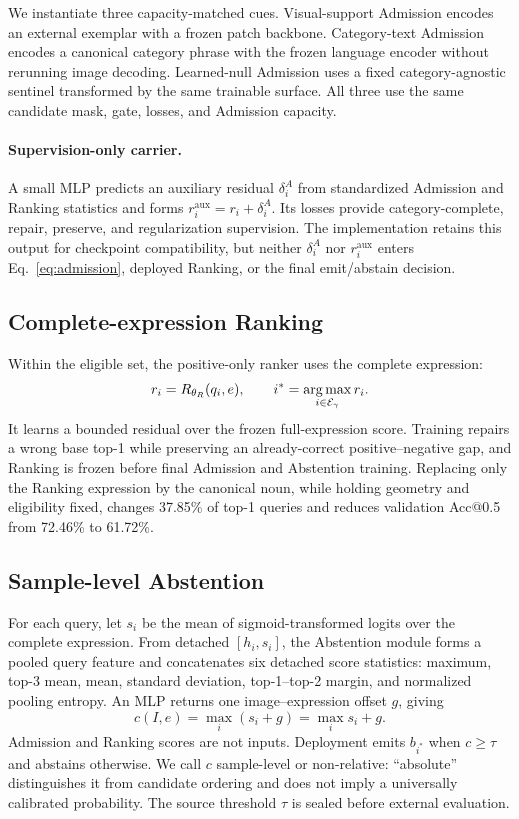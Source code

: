 We instantiate three capacity-matched cues.  Visual-support Admission encodes
an external exemplar with a frozen patch backbone.  Category-text Admission
encodes a canonical category phrase with the frozen language encoder without
rerunning image decoding.  Learned-null Admission uses a fixed
category-agnostic sentinel transformed by the same trainable surface.  All
three use the same candidate mask, gate, losses, and Admission capacity.

\paragraph{Supervision-only carrier.}
A small MLP predicts an auxiliary residual $\delta_i^A$ from standardized
Admission and Ranking statistics and forms
$r_i^{\mathrm{aux}}=r_i+\delta_i^A$.  Its losses provide category-complete,
repair, preserve, and regularization supervision.  The implementation retains
this output for checkpoint compatibility, but neither $\delta_i^A$ nor
$r_i^{\mathrm{aux}}$ enters Eq.~\eqref{eq:admission}, deployed Ranking, or the
final emit/abstain decision.

\subsection{Complete-expression Ranking}
Within the eligible set, the positive-only ranker uses the complete expression:
\begin{equation}
  r_i=R_{\theta_R}(q_i,e),\qquad
  i^*=\operatorname*{arg\,max}_{i\in\mathcal{E}_{\gamma}} r_i .
\end{equation}
It learns a bounded residual over the frozen full-expression score.  Training
repairs a wrong base top-1 while preserving an already-correct
positive--negative gap, and Ranking is frozen before final Admission and
Abstention training.  Replacing only the Ranking expression by the canonical
noun, while holding geometry and eligibility fixed, changes 37.85\% of top-1
queries and reduces validation Acc@0.5 from 72.46\% to 61.72\%.

\subsection{Sample-level Abstention}
For each query, let $s_i$ be the mean of sigmoid-transformed logits over the
complete expression.  From detached $[h_i,s_i]$, the Abstention module forms a
pooled query feature and concatenates six detached score statistics: maximum,
top-3 mean, mean, standard deviation, top-1--top-2 margin, and normalized
pooling entropy.  An MLP returns one image--expression offset $g$, giving
\begin{equation}
  c(I,e)=\max_i(s_i+g)=\max_i s_i+g.
\end{equation}
Admission and Ranking scores are not inputs.  Deployment emits $b_{i^*}$ when
$c\geq\tau$ and abstains otherwise.  We call $c$ sample-level or non-relative:
``absolute'' distinguishes it from candidate ordering and does not imply a
universally calibrated probability.  The source threshold $\tau$ is sealed
before external evaluation.


